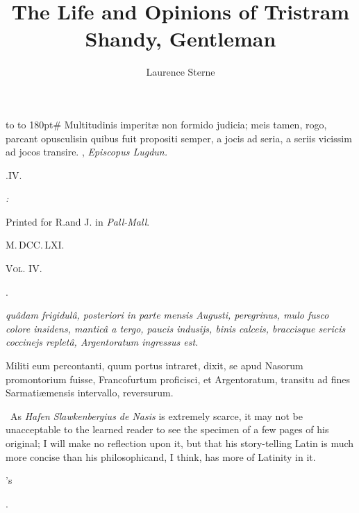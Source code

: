 \documentclass{article}
\title{The Life and Opinions of Tristram Shandy, Gentleman}
\author{Laurence Sterne}
\begin{document}
\pagestyle{empty}
\hbox{}
\vfill
\vbox{\openup 16pt\halign to }
\vfill
\newpage
\null
\newpage %
\pagestyle{empty}
\vbox{\openup 10pt}
\vfill
\vbox{\openup -2pt\halign to 180pt{\footnotesize #\cr
Multitudinis imperitæ non formido judicia; meis\cr
\quad tamen, rogo, parcant opusculis\tsh in quibus\cr
\quad fuit propositi semper, a jocis ad seria, a seriis\cr
\quad vicissim ad jocos transire.\hfill\cr
\hfill {},\cr
\hfill \textit{Episcopus Lugdun.}\cr}}
\vfill
\centerline{.\quad IV.}
\vfill
\centerline{\itshape{}:}
\centerline{\smaller Printed for R.\@ and J.\@ {} in \textit{Pall-Mall}.}
\centerline{M.\,DCC.\,LXI.}
\newpage
\null
\newpage
\null
\vfill
\noindent
\textsc{Vol. IV.}
\setcounter{page}{1}
\setlength{\baselineskip}{14pt}  %
\newpage
\centerline{\large{}}
\centerline{\large{}.}

\bgroup\itshape
{} quâdam frigidulâ,
po\-steriori in parte mensis {\normalshape Augusti}, peregrinus, mulo fusco
colore insidens, manticâ a tergo, paucis indusijs, binis
calceis, braccisque sericis coccinejs repletâ, {\normalshape Argentoratum}
ingressus est.

Militi eum percontanti, quum portus intraret, dixit, se apud
Nasorum promontorium fuisse, Francofurtum proficisci, et
Argentoratum, transitu ad fines Sarmatiæ\break mensis intervallo,
reversurum.\egroup


\vfill
\bgroup\fontsize{8}{10}\selectfont\indent\fnast\ 
As \textit{Hafen Slawkenbergius de Nasis} is extremely scarce, it may not be
unacceptable to the learned reader to see the specimen of a few pages of his
original; I will make no reflection upon it, but that his story-telling Latin
is much more concise than his philosophic\tsk and, I think, has more of
Latinity in it.\par
\egroup
\newpage
\centerline{\large{}'s}
\centerline{\large{}.}
\end{document}
